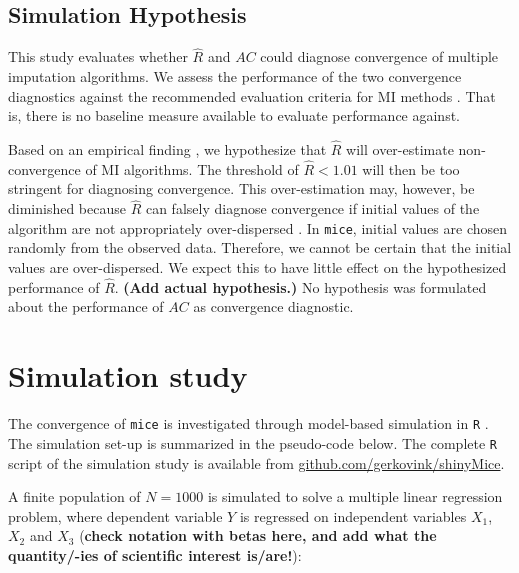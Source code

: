 \documentclass[Royal,times,sageh]{sagej}
\begin{document}
\hypertarget{simulation-hypothesis}{%
\subsection{Simulation Hypothesis}\label{simulation-hypothesis}}

This study evaluates whether \(\widehat{R}\) and \(AC\) could diagnose
convergence of multiple imputation algorithms. We assess the performance
of the two convergence diagnostics against the recommended evaluation
criteria for MI methods \citep[i.e., average bias, average confidence
interval width, and empirical coverage rate across simulations;][\(\S\)
2.5.2]{buur18}. That is, there is no baseline measure available to
evaluate performance against.

Based on an empirical finding \citep{lace07}, we hypothesize that
\(\widehat{R}\) will over-estimate non-convergence of MI algorithms. The
threshold of \(\widehat{R} < 1.01\) will then be too stringent for
diagnosing convergence. This over-estimation may, however, be diminished
because \(\widehat{R}\) can falsely diagnose convergence if initial
values of the algorithm are not appropriately over-dispersed
\citep[p.~437]{broo98}. In \texttt{mice}, initial values are chosen
randomly from the observed data. Therefore, we cannot be certain that
the initial values are over-dispersed. We expect this to have little
effect on the hypothesized performance of \(\widehat{R}\). \textbf{(Add
actual hypothesis.)} No hypothesis was formulated about the performance
of \(AC\) as convergence diagnostic.

\hypertarget{simulation-study}{%
\section{Simulation study}\label{simulation-study}}

The convergence of \texttt{mice} is investigated through model-based
simulation in \texttt{R} \citep[version 3.6.3;][]{R}. The simulation
set-up is summarized in the pseudo-code below. The complete \texttt{R}
script of the simulation study is available from
\href{https://github.com/gerkovink/shinyMice/tree/master/3.Thesis/1.SimulationStudy}{github.com/gerkovink/shinyMice}.

A finite population of \(N=1000\) is simulated to solve a multiple
linear regression problem, where dependent variable \(Y\) is regressed
on independent variables \(X_1\), \(X_2\) and \(X_3\) (\textbf{check
notation with betas here, and add what the quantity/-ies of scientific
interest is/are!}):
\end{document}
